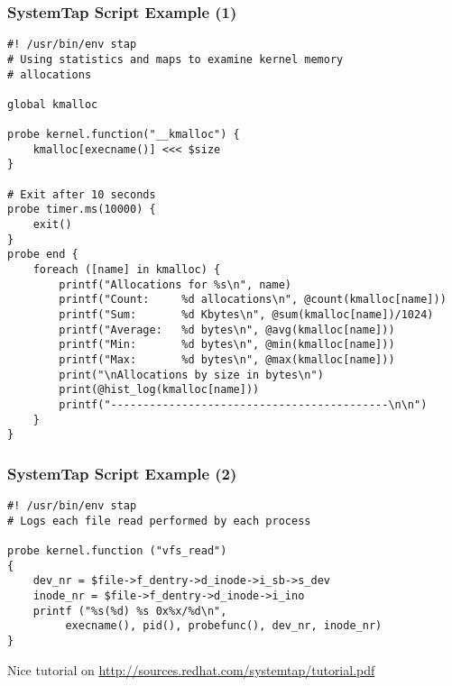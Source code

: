 \begin{frame}[fragile]
  \frametitle{SystemTap Script Example (1)}
{\tiny
\begin{verbatim}
#! /usr/bin/env stap
# Using statistics and maps to examine kernel memory
# allocations

global kmalloc

probe kernel.function("__kmalloc") {
    kmalloc[execname()] <<< $size
}

# Exit after 10 seconds
probe timer.ms(10000) {
    exit()
}
probe end {
    foreach ([name] in kmalloc) {
        printf("Allocations for %s\n", name)
        printf("Count:     %d allocations\n", @count(kmalloc[name]))
        printf("Sum:       %d Kbytes\n", @sum(kmalloc[name])/1024)
        printf("Average:   %d bytes\n", @avg(kmalloc[name]))
        printf("Min:       %d bytes\n", @min(kmalloc[name]))
        printf("Max:       %d bytes\n", @max(kmalloc[name]))
        print("\nAllocations by size in bytes\n")
        print(@hist_log(kmalloc[name]))
        printf("-------------------------------------------\n\n")
    }
}
\end{verbatim}
}
\end{frame}

\begin{frame}[fragile]
  \frametitle{SystemTap Script Example (2)}
{\small
\begin{verbatim}
#! /usr/bin/env stap
# Logs each file read performed by each process

probe kernel.function ("vfs_read")
{
    dev_nr = $file->f_dentry->d_inode->i_sb->s_dev
    inode_nr = $file->f_dentry->d_inode->i_ino
    printf ("%s(%d) %s 0x%x/%d\n",
         execname(), pid(), probefunc(), dev_nr, inode_nr)
}
\end{verbatim}
}
Nice tutorial on \url{http://sources.redhat.com/systemtap/tutorial.pdf}
\end{frame}
